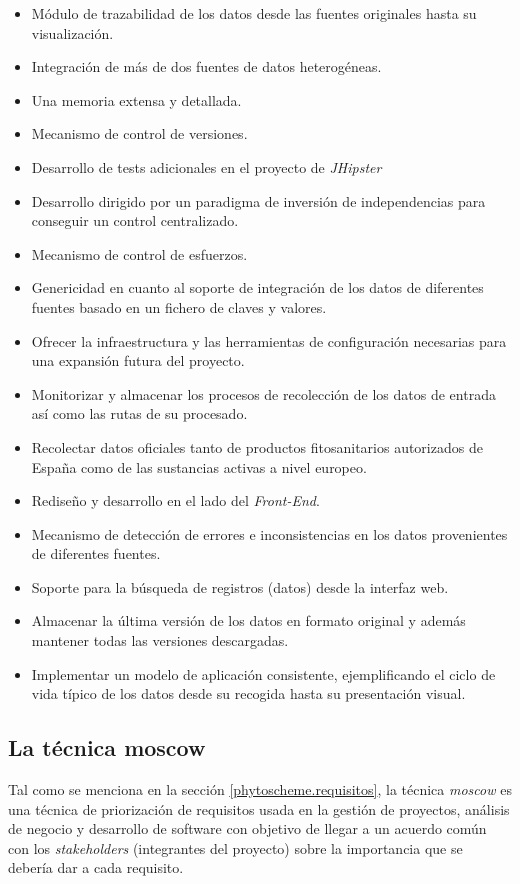 \begin{itemize}
\item Módulo de trazabilidad de los datos desde las fuentes originales hasta su visualización. 
\item Integración de más de dos fuentes de datos heterogéneas. 
\item Una memoria extensa y detallada.  
\item Mecanismo de control de versiones.
\item Desarrollo de tests adicionales en el proyecto de \textit{JHipster}
\item Desarrollo dirigido por un paradigma de inversión de independencias para conseguir un control centralizado.
\item Mecanismo de control de esfuerzos.
\item Genericidad en cuanto al soporte de integración de los datos de diferentes fuentes basado en un fichero de claves y valores. 
\item Ofrecer la infraestructura y las herramientas de configuración necesarias para una expansión futura del proyecto. 
\item Monitorizar y almacenar los procesos de recolección de los datos de entrada así como las rutas de su procesado.
\item Recolectar datos oficiales tanto de productos fitosanitarios autorizados de España como de las sustancias activas a nivel europeo. 
\item Rediseño y desarrollo en el lado del \textit{Front-End}.
\item Mecanismo de detección de errores e inconsistencias en los datos provenientes de diferentes fuentes.
\item Soporte para la búsqueda de registros (datos) desde la interfaz web. 
\item Almacenar la última versión de los datos en formato original y además mantener todas las versiones descargadas. 
\item Implementar un modelo de aplicación consistente, ejemplificando el ciclo de vida típico de los datos desde su recogida hasta su presentación visual. 
\end{itemize}

\subsection{La técnica \gls{moscow}} 
\label{c.analisis.requisitos.moscow}
Tal como se menciona en la sección \ref{phytoscheme.requisitos}, la técnica \textit{\gls{moscow}} es una técnica de priorización de requisitos usada en la gestión de proyectos, análisis de negocio y desarrollo de software con objetivo de llegar a un acuerdo común con los \textit{stakeholders} (integrantes del proyecto) sobre la importancia que se debería dar a cada requisito.
\par

